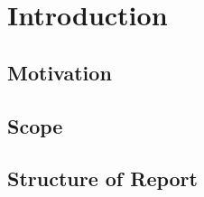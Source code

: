 \newpage
\chapter{Introduction}

\section{Motivation}

\section{Scope}

\section{Structure of Report}